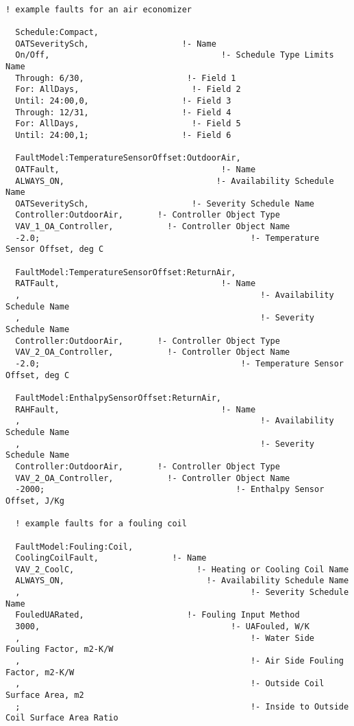 \begin{lstlisting}

! example faults for an air economizer

  Schedule:Compact,
  OATSeveritySch,                   !- Name
  On/Off,                                   !- Schedule Type Limits Name
  Through: 6/30,                     !- Field 1
  For: AllDays,                       !- Field 2
  Until: 24:00,0,                   !- Field 3
  Through: 12/31,                   !- Field 4
  For: AllDays,                       !- Field 5
  Until: 24:00,1;                   !- Field 6

  FaultModel:TemperatureSensorOffset:OutdoorAir,
  OATFault,                                 !- Name
  ALWAYS_ON,                               !- Availability Schedule Name
  OATSeveritySch,                     !- Severity Schedule Name
  Controller:OutdoorAir,       !- Controller Object Type
  VAV_1_OA_Controller,           !- Controller Object Name
  -2.0;                                           !- Temperature Sensor Offset, deg C

  FaultModel:TemperatureSensorOffset:ReturnAir,
  RATFault,                                 !- Name
  ,                                                 !- Availability Schedule Name
  ,                                                 !- Severity Schedule Name
  Controller:OutdoorAir,       !- Controller Object Type
  VAV_2_OA_Controller,           !- Controller Object Name
  -2.0;                                         !- Temperature Sensor Offset, deg C

  FaultModel:EnthalpySensorOffset:ReturnAir,
  RAHFault,                                 !- Name
  ,                                                 !- Availability Schedule Name
  ,                                                 !- Severity Schedule Name
  Controller:OutdoorAir,       !- Controller Object Type
  VAV_2_OA_Controller,           !- Controller Object Name
  -2000;                                       !- Enthalpy Sensor Offset, J/Kg

  ! example faults for a fouling coil

  FaultModel:Fouling:Coil,
  CoolingCoilFault,               !- Name
  VAV_2_CoolC,                         !- Heating or Cooling Coil Name
  ALWAYS_ON,                             !- Availability Schedule Name
  ,                                               !- Severity Schedule Name
  FouledUARated,                     !- Fouling Input Method
  3000,                                       !- UAFouled, W/K
  ,                                               !- Water Side Fouling Factor, m2-K/W
  ,                                               !- Air Side Fouling Factor, m2-K/W
  ,                                               !- Outside Coil Surface Area, m2
  ;                                               !- Inside to Outside Coil Surface Area Ratio
\end{lstlisting}

